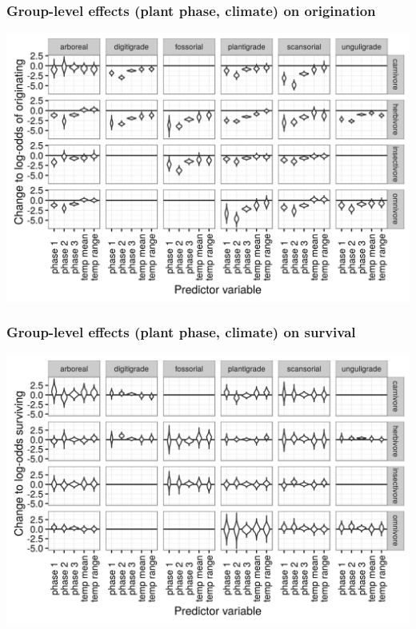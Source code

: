 \documentclass{beamer}
\begin{document}
\begin{frame}
  \frametitle{Group-level effects (plant phase, climate) on origination}
  \begin{center}
    \includegraphics[height=0.8\textheight,width=\textwidth,keepaspectratio=true]{figure/group_on_origin_bd}
  \end{center}
\end{frame}

\begin{frame}
  \frametitle{Group-level effects (plant phase, climate) on survival}
  \begin{center}
    \includegraphics[height=0.8\textheight,width=\textwidth,keepaspectratio=true]{figure/group_on_survival_bd}
  \end{center}
\end{frame}
\end{document}
